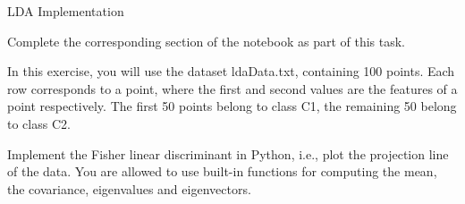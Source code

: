 \documentclass[
	english,
        solution=true
	]{tudaexercise}
\begin{document}
\newpage 

\begin{task}[points=5]{LDA Implementation}
\begin{programmingtaskbox}
Complete the corresponding section of the notebook as part of this task.
\end{programmingtaskbox}
In this exercise, you will use the dataset ldaData.txt, containing 100 points. Each row corresponds to a point, where the first and second values are the features of a point respectively. The first 50 points belong to class C1, the remaining 50 belong to class C2.
\begin{subtask}[points=5]{}
Implement the Fisher linear discriminant in Python, i.e., plot the projection line of the data. You are allowed to use built-in functions for computing the mean, the covariance, eigenvalues and eigenvectors.

\begin{solution}

\end{solution}
\end{subtask}
\end{task}

\clearpage
\end{document}
